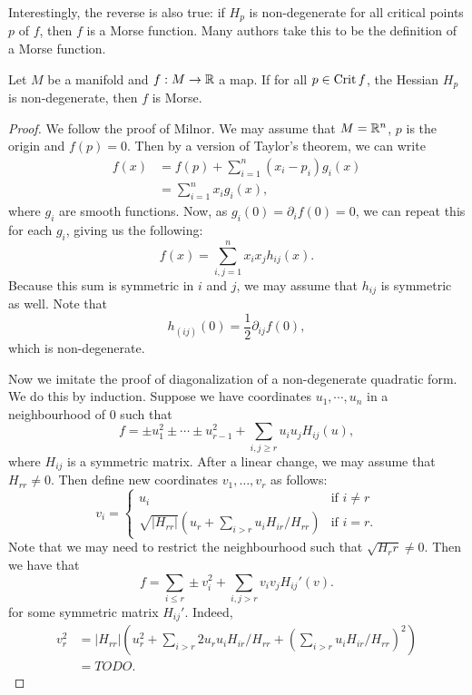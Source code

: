 Interestingly, the reverse is also true: if $H_p$ is non-degenerate for all critical points  $p$ of $f$, then  $f$ is a Morse function.
Many authors take this to be the definition of a Morse function.

\begin{lemma}
    Let $M$ be a manifold and $f: M \to  \mathbb{R}$ a map.
    If for all $p \in \operatorname{Crit} f$, the Hessian $H_p$ is non-degenerate, then $f$ is Morse.
\end{lemma}
\begin{proof}
    We follow the proof of Milnor.
    We may assume that $M = \mathbb{R}^{n}$, $p$ is the origin and $f(p) = 0$.
    Then by a version of Taylor's theorem, we can write
    \begin{align*}
        f(x)  &= f(p) + \sum_{i=1}^{n} (x_i - p_i) g_i (x)\\
              &= \sum_{i=1}^{n} x_i g_i(x)
    ,\end{align*} 
    where $g_i$ are smooth functions. 
    Now, as $g_i(0) = \partial_i f (0) = 0$, we can repeat this for each  $g_i$, giving us the following:
    \[
        f(x) = \sum_{i, j= 1}^{n} x_i x_j h_{ij}(x)
    .\] 
    Because this sum is symmetric in $i$ and  $j$, we may assume that  $h_{ij}$ is symmetric as well.
    Note that
    \[
        h_{(ij)}(0) = \frac{1}{2} \partial_{ij} f(0)
    ,\]
    which is non-degenerate.

    Now we imitate the proof of diagonalization of a non-degenerate quadratic form.
    We do this by induction.
    Suppose we have coordinates $u_1, \cdots, u_n$ in a neighbourhood of $0$ such that
    \[
        f = \pm u_1^2 \pm \cdots \pm u_{r-1}^2 + \sum_{i,j\ge r} u_i u_j H_{ij}(u)
    ,\] 
    where $H_{ij}$ is a symmetric matrix.
    After a linear change, we may assume that $H_{rr} \neq 0$.
    Then define new coordinates $ v_1, \ldots, v_r$ as follows:
    \[
        v_i = \begin{cases}
            u_i & \text{if $i \neq r$}\\
            \sqrt{|H_{rr}|} (u_r + \sum_{i > r} u_i H_{ir} / H_{rr}) & \text{if $i = r$.}
        \end{cases}
    \] 
    Note that we may need to restrict the neighbourhood such that $\sqrt{H_rr} \neq 0$.
    Then we have that
    \[
        f = \sum_{i\le r} \pm v_i^2 + \sum_{i,j > r} v_i v_j H_{ij}'(v)
    .\] 
    for some symmetric matrix $H_{ij}'$.
    Indeed,
    \begin{align*}
        v_r^2 &= |H_{rr}| \left(u_r^2 + \sum_{i>r} 2 u_r u_i H_{ir} / H_{rr} + \left(\sum_{i>r} u_i H_{ir} / H_{rr}\right)^2\right)\\
              &= TODO
    .\end{align*} 

\end{proof}


